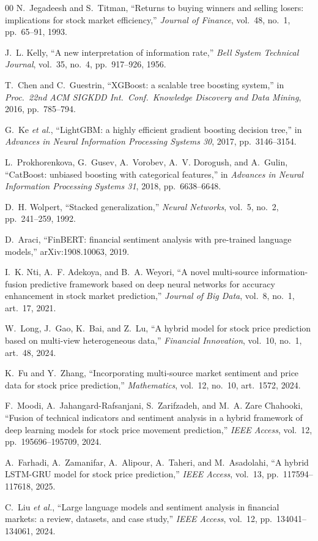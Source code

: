 \documentclass[conference]{IEEEtran}
\begin{document}
\begin{thebibliography}{00}
 N.~Jegadeesh and S.~Titman, ``Returns to buying winners and
selling losers: implications for stock market efficiency,'' \emph{Journal of
Finance}, vol.~48, no.~1, pp.~65--91, 1993.

 J.~L. Kelly, ``A new interpretation of information rate,''
\emph{Bell System Technical Journal}, vol.~35, no.~4, pp.~917--926, 1956.

 T.~Chen and C.~Guestrin, ``XGBoost: a scalable tree boosting
system,'' in \emph{Proc.\ 22nd ACM SIGKDD Int.\ Conf.\ Knowledge Discovery and Data
Mining}, 2016, pp.~785--794.

 G.~Ke \emph{et al.}, ``LightGBM: a highly efficient gradient
boosting decision tree,'' in \emph{Advances in Neural Information Processing Systems
30}, 2017, pp.~3146--3154.

 L.~Prokhorenkova, G.~Gusev, A.~Vorobev, A.~V. Dorogush,
and A.~Gulin, ``CatBoost: unbiased boosting with categorical features,'' in
\emph{Advances in Neural Information Processing Systems 31}, 2018, pp.~6638--6648.

 D.~H. Wolpert, ``Stacked generalization,'' \emph{Neural
Networks}, vol.~5, no.~2, pp.~241--259, 1992.

 D.~Araci, ``FinBERT: financial sentiment analysis with pre-trained
language models,'' arXiv:1908.10063, 2019.

 I.~K. Nti, A.~F. Adekoya, and B.~A. Weyori, ``A novel multi-source
information-fusion predictive framework based on deep neural networks for accuracy
enhancement in stock market prediction,'' \emph{Journal of Big Data}, vol.~8, no.~1,
art.~17, 2021.

 W.~Long, J.~Gao, K.~Bai, and Z.~Lu, ``A hybrid model for stock
price prediction based on multi-view heterogeneous data,'' \emph{Financial
Innovation}, vol.~10, no.~1, art.~48, 2024.

 K.~Fu and Y.~Zhang, ``Incorporating multi-source market sentiment
and price data for stock price prediction,'' \emph{Mathematics}, vol.~12, no.~10,
art.~1572, 2024.

 F.~Moodi, A.~Jahangard-Rafsanjani, S.~Zarifzadeh, and
M.~A. Zare Chahooki, ``Fusion of technical indicators and sentiment analysis in a
hybrid framework of deep learning models for stock price movement prediction,''
\emph{IEEE Access}, vol.~12, pp.~195696--195709, 2024.

 A.~Farhadi, A.~Zamanifar, A.~Alipour, A.~Taheri, and
M.~Asadolahi, ``A hybrid LSTM-GRU model for stock price prediction,'' \emph{IEEE
Access}, vol.~13, pp.~117594--117618, 2025.

 C.~Liu \emph{et al.}, ``Large language models and sentiment
analysis in financial markets: a review, datasets, and case study,'' \emph{IEEE
Access}, vol.~12, pp.~134041--134061, 2024.

\end{thebibliography}
\end{document}
